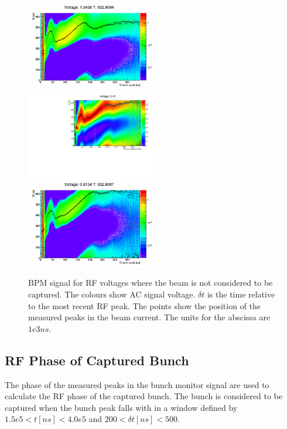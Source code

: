\documentclass{paper}
\begin{document}
\begin{figure}
		\includegraphics[width=0.5\textwidth]{images/V=1_05_fitted_bpm_to_rf_deltas}
		\includegraphics[width=0.5\textwidth]{images/V=0_81_fitted_bpm_to_rf_deltas}
		\includegraphics[width=0.5\textwidth]{images/V=0_62_fitted_bpm_to_rf_deltas}
	\caption{BPM signal for RF voltages where the beam is not considered to be
           captured. The colours show AC signal voltage. $\delta t$ is the time
           relative to the most recent RF peak. The points show the position of
           the measured peaks in the beam current. The units for the abscissa
           are $1e3 ns$.}
	\label{fig:bm_signal_periodic_not_captured}
\end{figure}

\subsection{RF Phase of Captured Bunch}
The phase of the measured peaks in the bunch monitor signal are used to 
calculate the RF phase of the captured bunch. The bunch is considered to be
captured when the  bunch peak falls  with in a window defined by 
$1.5e5 < t [ns] < 4.0e5$ and $200 < \delta t [ns] < 500 $.
\end{document}
